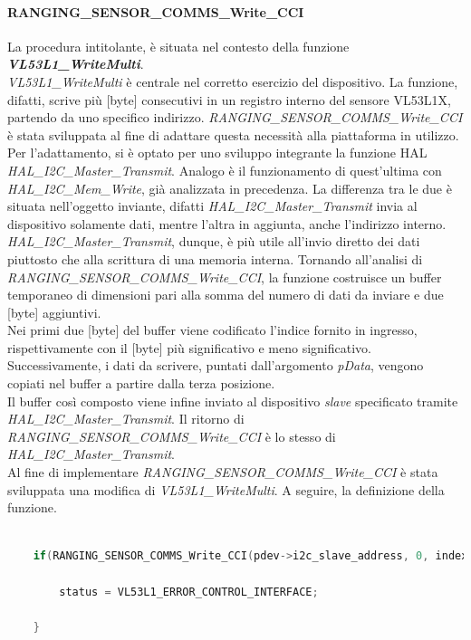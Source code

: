 \documentclass[11pt]{report}
\begin{document}
\paragraph{RANGING\_SENSOR\_COMMS\_Write\_CCI}
La procedura intitolante, è situata nel contesto della funzione \textbf{\textit{VL53L1\_WriteMulti}}.\\
\textit{VL53L1\_WriteMulti} è centrale nel corretto esercizio del dispositivo. La funzione, difatti, scrive più [byte] consecutivi in un registro interno del sensore VL53L1X, partendo da uno specifico indirizzo.
\textit{RANGING\_SENSOR\_COMMS\_Write\_CCI} è stata sviluppata al fine di adattare questa necessità alla piattaforma in utilizzo.\\
Per l'adattamento, si è optato per uno sviluppo integrante la funzione HAL\\\textit{HAL\_I2C\_Master\_Transmit}. Analogo è il funzionamento di quest'ultima con\\\textit{HAL\_I2C\_Mem\_Write}, già analizzata in precedenza.
La differenza tra le due è situata nell'oggetto inviante, difatti \textit{HAL\_I2C\_Master\_Transmit} invia al dispositivo solamente dati, mentre l'altra in aggiunta, anche l'indirizzo interno. \textit{HAL\_I2C\_Master\_Transmit}, dunque, è più utile all'invio diretto dei dati piuttosto che alla scrittura di una memoria interna.
Tornando all'analisi di \textit{RANGING\_SENSOR\_COMMS\_Write\_CCI}, la funzione costruisce un buffer temporaneo di dimensioni pari alla somma del numero di dati da inviare e due [byte] aggiuntivi.\\
Nei primi due [byte] del buffer viene codificato l'indice fornito in ingresso, rispettivamente con il [byte] più significativo e meno significativo.\\
Successivamente, i dati da scrivere, puntati dall'argomento \textit{pData}, vengono copiati nel buffer a partire dalla terza posizione.\\
Il buffer così composto viene infine inviato al dispositivo \textit{slave} specificato tramite\\\textit{HAL\_I2C\_Master\_Transmit}.
Il ritorno di \textit{RANGING\_SENSOR\_COMMS\_Write\_CCI} è lo stesso di \textit{HAL\_I2C\_Master\_Transmit}.\\
Al fine di implementare \textit{RANGING\_SENSOR\_COMMS\_Write\_CCI} è stata sviluppata una modifica di \textit{VL53L1\_WriteMulti}.
A seguire, la definizione della funzione.

\begin{lstlisting}[language=Cpp, caption={Dettaglio sull'implementazione di \textit{RANGING\_SENSOR\_COMMS\_Write\_CCI} in \textit{VL53L1\_WriteMulti} }]
    
    if(RANGING_SENSOR_COMMS_Write_CCI(pdev->i2c_slave_address, 0, index+position, pdata+position, data_size) != HAL_OK){
        
        status = VL53L1_ERROR_CONTROL_INTERFACE;

    }

\end{lstlisting}
\end{document}
